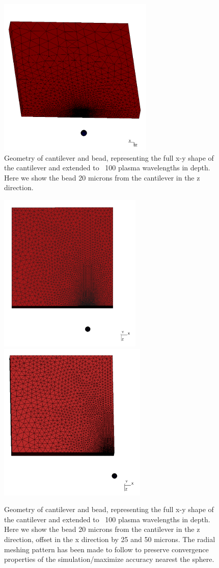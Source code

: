 \documentclass[11pt,traditabstract]{article}
\begin{document}
\begin{figure}[!h]
\centering
\includegraphics[height=3in]{Bead_positions}
\caption{Geometry of cantilever and bead, representing the full x-y shape of the cantilever and extended to ~100 plasma wavelengths in depth. Here we show the bead 20 microns from the cantilever in the z direction.}\label{fig:geoLarge}
\end{figure}

\begin{figure}[!h]
\centering
\includegraphics[height=3in]{L-20_W-25}
\includegraphics[height=3in]{L-20_W-50}
\caption{Geometry of cantilever and bead, representing the full x-y shape of the cantilever and extended to ~100 plasma wavelengths in depth. Here we show the bead 20 microns from the cantilever in the z direction, offset in the x direction by 25 and 50 microns. The radial meshing pattern has been made to follow to preserve convergence properties of the simulation/maximize accuracy nearest the sphere.}\label{fig:geoLat}
\end{figure}
\end{document}
